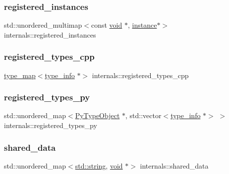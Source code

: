 \subsubsection{\texorpdfstring{registered\_instances}{registered\_instances}}
{\footnotesize\ttfamily std\+::unordered\+\_\+multimap$<$const \mbox{\hyperlink{_s_d_l__opengles2__gl2ext_8h_ae5d8fa23ad07c48bb609509eae494c95}{void}} $\ast$, \mbox{\hyperlink{structinstance}{instance}}$\ast$$>$ internals\+::registered\+\_\+instances}

\mbox{\label{structinternals_a55c8874ee4ee135c2ed8b3f5a958e6a3}} 
\subsubsection{\texorpdfstring{registered\_types\_cpp}{registered\_types\_cpp}}
{\footnotesize\ttfamily \mbox{\hyperlink{internals_8h_a1452521ed22e2af29a7f00dfd4bacb0b}{type\+\_\+map}}$<$\mbox{\hyperlink{structtype__info}{type\+\_\+info}} $\ast$$>$ internals\+::registered\+\_\+types\+\_\+cpp}

\mbox{\label{structinternals_a6148bb4956e17d8a61f410cac7227d04}} 
\subsubsection{\texorpdfstring{registered\_types\_py}{registered\_types\_py}}
{\footnotesize\ttfamily std\+::unordered\+\_\+map$<$\mbox{\hyperlink{_python27_2object_8h_a42a55dd6e973872c7a6bc61632070f6f}{Py\+Type\+Object}} $\ast$, std\+::vector$<$\mbox{\hyperlink{structtype__info}{type\+\_\+info}} $\ast$$>$ $>$ internals\+::registered\+\_\+types\+\_\+py}

\mbox{\label{structinternals_ad52baba07c7497fa2797e7db740707f4}} 
\subsubsection{\texorpdfstring{shared\_data}{shared\_data}}
{\footnotesize\ttfamily std\+::unordered\+\_\+map$<$\mbox{\hyperlink{_s_d_l__opengl__glext_8h_ab4ccfaa8ab0e1afaae94dc96ef52dde1}{std\+::string}}, \mbox{\hyperlink{_s_d_l__opengles2__gl2ext_8h_ae5d8fa23ad07c48bb609509eae494c95}{void}} $\ast$$>$ internals\+::shared\+\_\+data}

